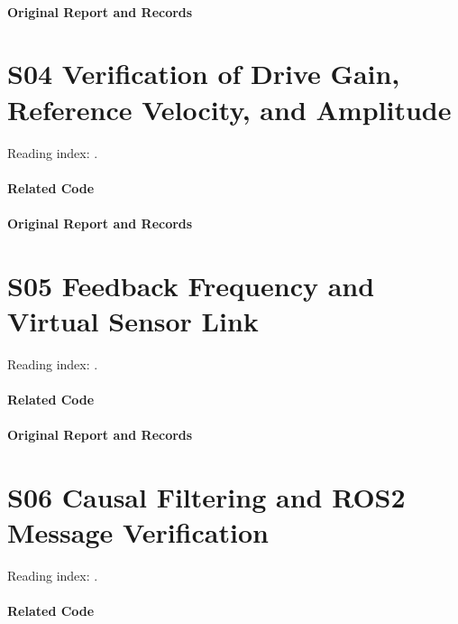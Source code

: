 \paragraph{Original Report and Records}
\noindent{}\par
\section*{S04 Verification of Drive Gain, Reference Velocity, and Amplitude}
\hypertarget{code-s04}{}
Reading index: .
\paragraph{Related Code}
\noindent{}\par
\paragraph{Original Report and Records}
\noindent{}\par
\section*{S05 Feedback Frequency and Virtual Sensor Link}
\hypertarget{code-s05}{}
Reading index: .
\paragraph{Related Code}
\noindent{}\par
\paragraph{Original Report and Records}
\noindent{}\par
\section*{S06 Causal Filtering and ROS2 Message Verification}
\hypertarget{code-s06}{}
Reading index: .
\paragraph{Related Code}
\noindent{}\par
